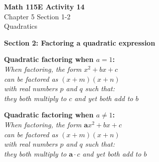\documentclass{article}
\begin{document}
\begin{center}
    \Large \textbf{Math 115E Activity 14} \\
    \vspace{0.2cm}
    \normalsize Chapter 5 Section 1-2 \\
    \normalsize Quadratics
\end{center}

\noindent
\textbf{Section 2: Factoring a quadratic expression}\\
\noindent
\begin{minipage}[t]{0.48\textwidth}
\begin{tcolorbox}[
    width=\linewidth,
    colframe=black,         %
    colback=white,          %
    boxrule=0.5pt,          %
    left=1mm, right=1.1mm,    %
    top=1mm, bottom=1mm,    %
    arc=2mm                 %
]
\textbf{Quadratic factoring when $a = 1$: \\} 
\textit{When factoring, the form $x^2 + bx + c$ \\
can be factored as $(x+m)(x+n)$\\
with real numbers $p$ and $q$ such that: \\
they both multiply to $c$ and yet both add to $b$}
\end{tcolorbox}
\end{minipage}%
\hfill
\begin{minipage}[t]{0.48\textwidth}
\begin{tcolorbox}[
    width=\linewidth,
    colframe=black,         %
    colback=white,          %
    boxrule=0.5pt,          %
    left=1mm, right=1.1mm,    %
    top=1mm, bottom=1mm,    %
    arc=2mm                 %
]
\textbf{Quadratic factoring when $a \neq 1$: \\} 
\textit{When factoring, the form $\boldsymbol{a}x^2 + bx + c$ \\
can be factored as $(x+m)(x+n)$\\
with real numbers $p$ and $q$ such that: \\
they both multiply to $\boldsymbol{a} \cdot c$ and yet both add to $b$}
\end{tcolorbox}
\end{minipage}
\end{document}
